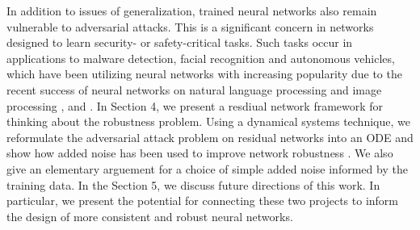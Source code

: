 \documentclass[12pt]{article}
\begin{document}
\indent In addition to issues of generalization, trained neural networks also remain vulnerable to adversarial attacks. This is a significant concern in networks designed to learn security- or safety-critical tasks. Such tasks occur in applications to malware detection, facial recognition and autonomous vehicles, which have been utilizing neural networks with increasing popularity due to the recent success of neural networks on natural language processing and image processing \cite{imageconv}, \cite{rectifiers} and \cite{langproc}. In Section 4, we present a resdiual network framework for thinking about the robustness problem. Using a dynamical systems technique, we reformulate the adversarial attack problem on residual networks into an ODE and show how added noise has been used to improve network robustness \cite{res}. We also give an elementary arguement for a choice of simple added noise informed by the training data. In the Section 5, we discuss future directions of this work. In particular, we present the potential for connecting these two projects to inform the design of more consistent and robust neural networks.
\end{document}
